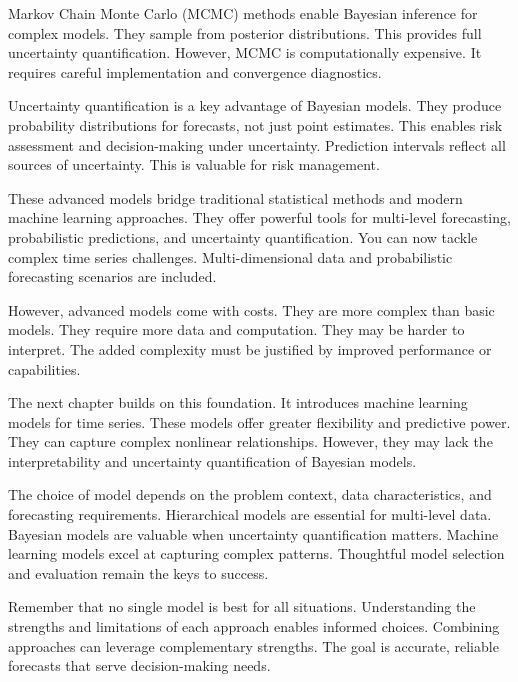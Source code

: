 Markov Chain Monte Carlo (MCMC) methods enable Bayesian inference for complex models. They sample from posterior distributions. This provides full uncertainty quantification. However, MCMC is computationally expensive. It requires careful implementation and convergence diagnostics.

Uncertainty quantification is a key advantage of Bayesian models. They produce probability distributions for forecasts, not just point estimates. This enables risk assessment and decision-making under uncertainty. Prediction intervals reflect all sources of uncertainty. This is valuable for risk management.

These advanced models bridge traditional statistical methods and modern machine learning approaches. They offer powerful tools for multi-level forecasting, probabilistic predictions, and uncertainty quantification. You can now tackle complex time series challenges. Multi-dimensional data and probabilistic forecasting scenarios are included.

However, advanced models come with costs. They are more complex than basic models. They require more data and computation. They may be harder to interpret. The added complexity must be justified by improved performance or capabilities.

The next chapter builds on this foundation. It introduces machine learning models for time series. These models offer greater flexibility and predictive power. They can capture complex nonlinear relationships. However, they may lack the interpretability and uncertainty quantification of Bayesian models.

The choice of model depends on the problem context, data characteristics, and forecasting requirements. Hierarchical models are essential for multi-level data. Bayesian models are valuable when uncertainty quantification matters. Machine learning models excel at capturing complex patterns. Thoughtful model selection and evaluation remain the keys to success.

Remember that no single model is best for all situations. Understanding the strengths and limitations of each approach enables informed choices. Combining approaches can leverage complementary strengths. The goal is accurate, reliable forecasts that serve decision-making needs.


